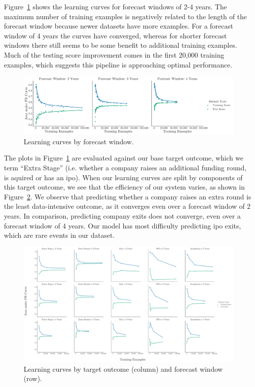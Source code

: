 \documentclass[../thesis/thesis.tex]{subfiles}
\begin{document}
Figure~\ref{fig:evaluation:learning_window} shows the learning curves for forecast windows of 2-4 years. The maximum number of training examples is negatively related to the length of the forecast window because newer datasets have more examples. For a forecast window of 4 years the curves have converged, whereas for shorter forecast windows there still seems to be some benefit to additional training examples. Much of the testing score improvement comes in the first 20,000 training examples, which suggests this pipeline is approaching optimal performance.

\begin{figure}[!htb]
    \centering
    \includegraphics[width=\textwidth]{../figures/evaluation/learning_curves_window}
    \caption[Learning curves by forecast window]{Learning curves by forecast window.}
    \label{fig:evaluation:learning_window}
\end{figure}

The plots in Figure~\ref{fig:evaluation:learning_window} are evaluated against our base target outcome, which we term ``Extra Stage'' (i.e. whether a company raises an additional funding round, is aquired or has an \gls{ipo}). When our learning curves are split by components of this target outcome, we see that the efficiency of our system varies, as shown in Figure~\ref{fig:evaluation:learning_outcome_window}. We observe that predicting whether a company raises an extra round is the least data-intensive outcome, as it converges even over a forecast window of 2 years. In comparison, predicting company exits does not converge, even over a forecast window of 4 years. Our model has most difficulty predicting \gls{ipo} exits, which are rare events in our dataset.

\begin{figure}[!htb]
    \centering
    \includegraphics[width=\textwidth]{../figures/evaluation/learning_curves_outcome}
    \caption[Learning curves by target outcome]{Learning curves by target outcome (column) and forecast window (row).}
    \label{fig:evaluation:learning_outcome_window}
\end{figure}
\end{document}
